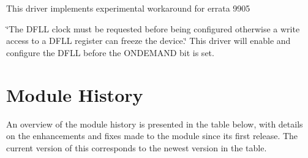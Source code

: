 \begin{DoxyItemize}
\item This driver implements experimental workaround for errata 9905

\char`\"{}\+The D\+F\+L\+L clock must be requested before being configured otherwise a
   write access to a D\+F\+L\+L register can freeze the device.\char`\"{} This driver will enable and configure the D\+F\+LL before the O\+N\+D\+E\+M\+A\+ND bit is set.
\end{DoxyItemize}\hypertarget{asfdoc_sam0_system_clock_extra_asfdoc_sam0_system_clock_extra_history}{}\section{Module History}\label{asfdoc_sam0_system_clock_extra_asfdoc_sam0_system_clock_extra_history}
An overview of the module history is presented in the table below, with details on the enhancements and fixes made to the module since its first release. The current version of this corresponds to the newest version in the table.


